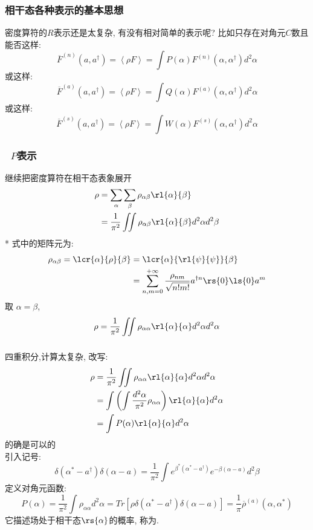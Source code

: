  \begin{frame} 
 \frametitle{相干态各种表示的基本思想}
    密度算符的$R$表示还是太复杂, 有没有相对简单的表示呢? 比如只存在对角元$C$数且
    能否这样:
    \[ \overline{F}^{(n)}(a, a^{\dagger}) = \left\langle \rho F \right\rangle = \int P(\alpha) F^{(n)} (\alpha, \alpha^{\dagger}) d^2 \alpha \]
    或这样:
    \[ \overline{F}^{(a)}(a, a^{\dagger}) = \left\langle \rho F \right\rangle = \int Q(\alpha) F^{(a)}(\alpha, \alpha^{\dagger}) d^2 \alpha\]
    或这样:
    \[ \overline{F}^{(s)}(a, a^{\dagger}) = \left\langle \rho F \right\rangle = \int W(\alpha) F^{(s)}(\alpha, \alpha^{\dagger}) d^2 \alpha\]
 \end{frame}

\begin{frame}  
  \frametitle{~$P$表示}
    继续把密度算符在相干态表象展开
    \[ \begin{aligned}
      \rho  &= \sum_\alpha\sum_\beta \rho_{\alpha \beta}\rl{\alpha}{\beta} \\
      &= \frac{1}{\pi^2} \iint \rho_{\alpha \beta}\rl{\alpha}{\beta} d^2 \alpha d^2 \beta 
    \end{aligned}\]
    *  式中的矩阵元为: 
    \[ \begin{aligned}
        \rho_{\alpha \beta} = \lcr{\alpha}{\rho}{\beta} &= \lcr{\alpha}{\rl{\psi}{\psi}}{\beta} \\ 
        &= \sum_{n,m=0} ^{+\infty} \frac{\rho_{nm}}{\sqrt{n!m!}} a^{\dagger n } \rs{0 } \ls{0} a^{ m } 
      \end{aligned}\]
    取 $\alpha=\beta$, 
    \[ \rho = \frac{1}{\pi^2} \iint \rho_{\alpha \alpha}\rl{\alpha}{\alpha} d^2 \alpha d^2 \alpha \]   
   \end{frame}

   \begin{frame} 
    \frametitle{}
    四重积分,计算太复杂, 改写:
    \[ \begin{aligned}
        \rho & = \frac{1}{\pi^2} \iint \rho_{\alpha \alpha}\rl{\alpha}{\alpha} d^2 \alpha d^2 \alpha \\ 
        & =  \int \left( \int\frac{d^2 \alpha}{\pi^2} \rho_{\alpha \alpha}\right)\rl{\alpha}{\alpha}  d^2 \alpha \\ 
        & =  \int P(\alpha) \rl{\alpha}{\alpha}  d^2 \alpha
      \end{aligned}\] 
    的确是可以的 \\ {\vspace*{0.3em}}
    引入记号:
    \[ \delta(\alpha^* -a^{\dagger})\delta(\alpha -a) = \frac{1}{\pi^2}\int e^{\beta^* (\alpha^* -a^{\dagger})}e^{-\beta (\alpha -a )} d^2 \beta\]
    定义对角元函数:
    \[ P(\alpha) = \frac{1}{\pi^2} \int \rho_{\alpha \alpha}d^2 \alpha=Tr[\rho \delta(\alpha^* -a^{\dagger})\delta(\alpha -a)]=\frac{1}{\pi} \overline{\rho}^{(a)}(\alpha, \alpha^*) \]
    它描述场处于相干态$\rs{\alpha }$的概率, 称为{\color{red}{准概率-$P$函数}}.
    \end{frame}
    
